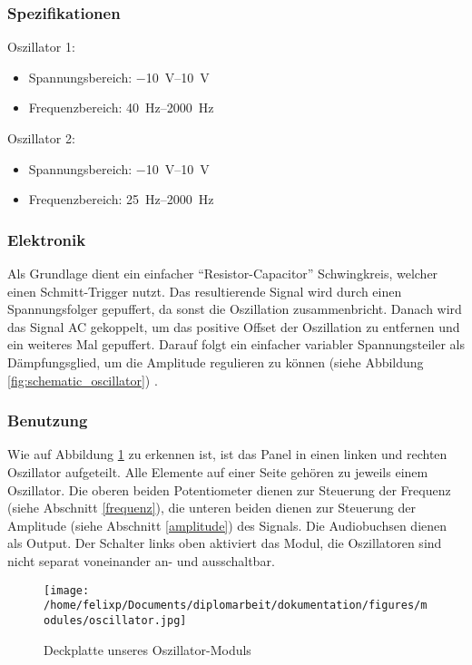 \subsubsection{Spezifikationen}
\label{sec:org34a543f}
Oszillator 1:
\begin{itemize}
\item Spannungsbereich: \SIrange{-10}{+10}{\volt}
\item Frequenzbereich: \SIrange{40}{2000}{\hertz}
\end{itemize}

Oszillator 2:
\begin{itemize}
\item Spannungsbereich: \SIrange{-10}{+10}{\volt}
\item Frequenzbereich: \SIrange{25}{2000}{\hertz}
\end{itemize}

\subsubsection{Elektronik}
\label{sec:orge23f192}
Als Grundlage dient ein einfacher "`Resistor-Capacitor"' Schwingkreis, welcher einen Schmitt-Trigger nutzt. Das resultierende Signal wird durch einen Spannungsfolger gepuffert, da sonst die Oszillation zusammenbricht. Danach wird das Signal AC gekoppelt, um das positive Offset der Oszillation zu entfernen und ein weiteres Mal gepuffert. Darauf folgt ein einfacher variabler Spannungsteiler als Dämpfungsglied, um die Amplitude regulieren zu können (siehe Abbildung \ref{fig:schematic_oscillator}) \cite{klein:osci}. 

\subsubsection{Benutzung}
\label{sec:org850de81}
Wie auf Abbildung \ref{fig:org904e781} zu erkennen ist, ist das Panel in einen linken und rechten Oszillator aufgeteilt. Alle Elemente auf einer Seite gehören zu jeweils einem Oszillator. Die oberen beiden Potentiometer dienen zur Steuerung der Frequenz (siehe Abschnitt \ref{frequenz}), die unteren beiden dienen zur Steuerung der Amplitude (siehe Abschnitt \ref{amplitude}) des Signals. Die Audiobuchsen dienen als Output. Der Schalter links oben aktiviert das Modul, die Oszillatoren sind nicht separat voneinander an- und ausschaltbar.

\begin{figure}[hp]
\centering
\texttt{[image: /home/felixp/Documents/diplomarbeit/dokumentation/figures/modules/oscillator.jpg]}
\caption{\label{fig:org904e781}Deckplatte unseres Oszillator-Moduls}
\end{figure}

